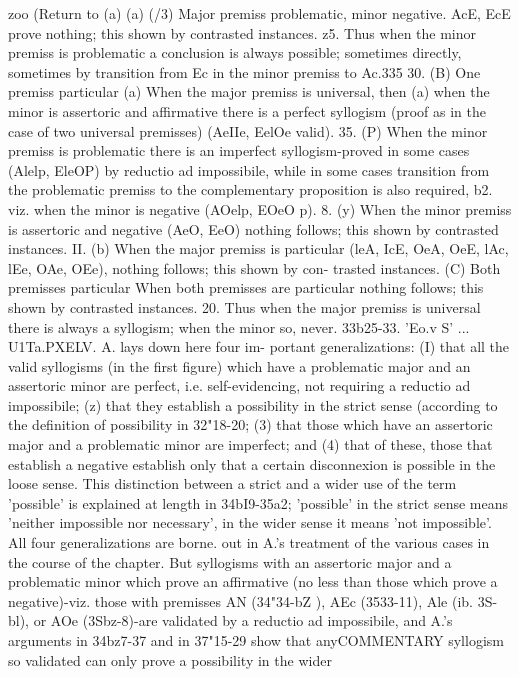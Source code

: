 {{{{{zoo (Return to (a) (a) (/3) Major premiss problematic, minor
negative. AcE, EcE prove nothing; this shown by contrasted
instances.
z5. Thus when the minor premiss is problematic a conclusion
is always possible; sometimes directly, sometimes by transition
from Ec in the minor premiss to Ac.335
30.
(B) One premiss particular
(a) When the major premiss is universal, then (a) when the
minor is assertoric and affirmative there is a perfect syllogism
(proof as in the case of two universal premisses) (AeIIe, EelOe
valid).
35. (P) When the minor premiss is problematic there is an
imperfect syllogism-proved in some cases (Alelp, EleOP) by
reductio ad impossibile, while in some cases transition from the
problematic premiss to the complementary proposition is also
required,
b2. viz. when the minor is negative (AOelp, EOeO p).
8. (y) When the minor premiss is assertoric and negative
(AeO, EeO) nothing follows; this shown by contrasted instances.
II. (b) When the major premiss is particular (leA, IcE, OeA,
OeE, lAc, lEe, OAe, OEe), nothing follows; this shown by con-
trasted instances.
(C) Both premisses particular
When both premisses are particular nothing follows; this shown
by contrasted instances.
20. Thus when the major premiss is universal there is always a
syllogism; when the minor so, never.
33b25-33. 'Eo.v S' ... U1Ta.PXELV. A. lays down here four im-
portant generalizations: (I) that all the valid syllogisms (in the
first figure) which have a problematic major and an assertoric
minor are perfect, i.e. self-evidencing, not requiring a reductio ad
impossibile; (z) that they establish a possibility in the strict
sense (according to the definition of possibility in 32"18-20; (3)
that those which have an assertoric major and a problematic
minor are imperfect; and (4) that of these, those that establish
a negative establish only that a certain disconnexion is possible
in the loose sense. This distinction between a strict and a wider
use of the term 'possible' is explained at length in 34bI9-35a2;
'possible' in the strict sense means 'neither impossible nor
necessary', in the wider sense it means 'not impossible'.
All four generalizations are borne. out in A.'s treatment of the
various cases in the course of the chapter. But syllogisms with
an assertoric major and a problematic minor which prove an
affirmative (no less than those which prove a negative)-viz.
those with premisses AN (34"34-bZ ), AEc (3533-11), Ale (ib.
3S-bl), or AOe (3Sbz-8)-are validated by a reductio ad impossibile,
and A.'s arguments in 34bz7-37 and in 37"15-29 show that anyCOMMENTARY
syllogism so validated can only prove a possibility in the wider
}}}}}
